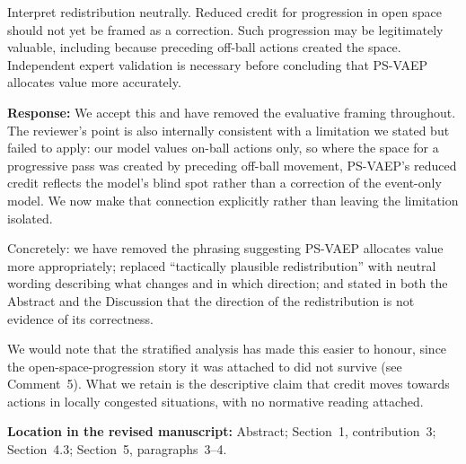 \documentclass[11pt,a4paper]{article}
\newcommand{\response}[2]{%
  \begin{responsebox}
  \textbf{Response:}
  #1
  \end{responsebox}
  \begin{locationbox}
  \textbf{Location in the revised manuscript:}
  #2
  \end{locationbox}
}
\begin{document}
\begin{reviewbox}
Interpret redistribution neutrally. Reduced credit for progression in open space should not yet be framed as a correction. Such progression may be legitimately valuable, including because preceding off-ball actions created the space. Independent expert validation is necessary before concluding that PS-VAEP allocates value more accurately.
\end{reviewbox}
\response{We accept this and have removed the evaluative framing throughout. The reviewer's point is also internally consistent with a limitation we stated but failed to apply: our model values on-ball actions only, so where the space for a progressive pass was created by preceding off-ball movement, PS-VAEP's reduced credit reflects the model's blind spot rather than a correction of the event-only model. We now make that connection explicitly rather than leaving the limitation isolated.

Concretely: we have removed the phrasing suggesting PS-VAEP allocates value more appropriately; replaced ``tactically plausible redistribution'' with neutral wording describing what changes and in which direction; and stated in both the Abstract and the Discussion that the direction of the redistribution is not evidence of its correctness.

We would note that the stratified analysis has made this easier to honour, since the open-space-progression story it was attached to did not survive (see Comment~5). What we retain is the descriptive claim that credit moves towards actions in locally congested situations, with no normative reading attached.}{Abstract; Section~1, contribution~3; Section~4.3; Section~5, paragraphs~3--4.}
\end{document}
